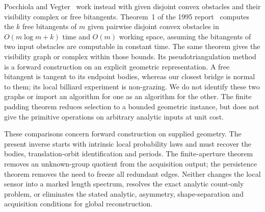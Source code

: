 Pocchiola and Vegter~\cite{PV,PV95} work instead with given disjoint
convex obstacles and their visibility complex or free bitangents.
Theorem~1 of the 1995 report~\cite{PV95} computes the $k$ free
bitangents of $m$ given pairwise disjoint convex obstacles in
$O(m\log m+k)$ time and $O(m)$ working space, assuming the
bitangents of two input obstacles are computable in constant time.
The same theorem gives the visibility graph or complex within those
bounds. Its pseudotriangulation method is a forward construction on an
explicit geometric representation. A free bitangent is tangent
to its endpoint bodies, whereas our closest bridge is normal to them;
its local billiard experiment is non-grazing. We do not identify these
two graphs or import an algorithm for one as an algorithm for the other.
The finite padding theorem reduces selection to a bounded geometric
instance, but does not give the primitive operations on arbitrary
analytic inputs at unit cost.

These comparisons concern forward construction on supplied geometry.
The present inverse starts with intrinsic local probability laws and
must recover the bodies, translation-orbit identification and periods.
The finite-aperture theorem removes an unknown-group quotient from the
acquisition output; the persistence theorem removes the need to freeze
all redundant edges. Neither changes the local sensor into a marked
length spectrum, resolves the exact analytic count-only problem, or
eliminates the stated analytic, asymmetry, shape-separation and acquisition
conditions for global reconstruction.

